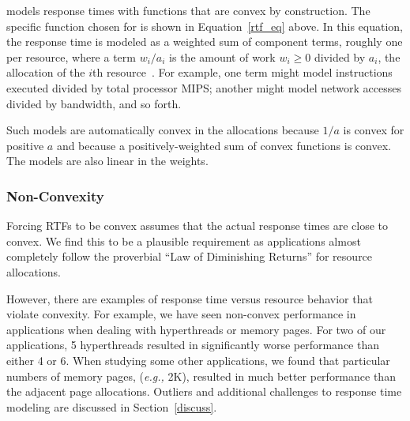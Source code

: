 \pacora models response times with functions that are convex by construction.
The specific function chosen for \pacora is shown in Equation~\ref{rtf_eq} above.
In this equation, the response time is modeled as a weighted sum of component terms,
roughly one per resource, where a term $w_i/a_i$ is the amount of work $w_i \geq 0$
divided by $a_i$, the allocation of the $i$th resource~\cite{Snav}.
For example, one term might model instructions executed divided by total processor MIPS;
another might model network accesses divided by bandwidth, and so forth.

Such models are automatically convex in the allocations because $1/a$ is convex for positive $a$ and because a positively-weighted sum of convex functions is convex.  The models are also linear in the weights.


\subsubsection*{Non-Convexity}
Forcing RTFs to be convex assumes that the actual response times are close to convex. We find this to be a plausible requirement as applications almost completely follow the proverbial ``Law of Diminishing Returns'' for resource allocations.

However, there are examples of response time versus resource behavior that violate convexity.   For example, we have seen non-convex performance in applications when dealing with hyperthreads or memory pages.  For two of our applications, 5 hyperthreads resulted in significantly worse performance than either 4 or 6.  When studying some other applications, we found that particular numbers of memory pages, (\emph{e.g.,} 2K), resulted in much better performance than the adjacent page allocations.  Outliers and additional challenges to response time modeling are discussed in Section~\ref{discuss}.

